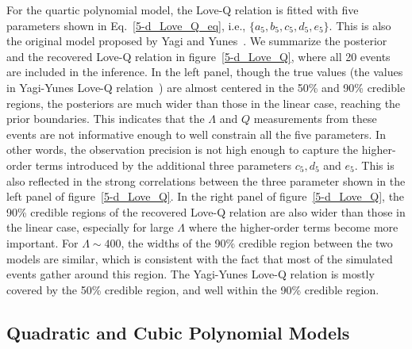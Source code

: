 \documentclass[a4paper,11pt]{article}
\begin{document}
For the quartic polynomial model, the Love-Q relation is fitted with five parameters shown in Eq.~\eqref{5-d_Love_Q_eq}, i.e., $\{a_5, b_5, c_5, d_5, e_5\}$. This is also the original model proposed by Yagi and Yunes~\cite{Yagi:2013awa}. We summarize the posterior and the recovered Love-Q relation in figure~\ref{5-d_Love_Q}, where
all 20 events are included in the inference. In the left panel, though the true values (the values in Yagi-Yunes Love-Q
relation~\cite{Yagi:2013awa}) are almost centered in the 50\% and 90\% credible regions, the posteriors are much wider than those in the linear case, reaching the prior boundaries. This indicates that the $\Lambda$ and $Q$ measurements
from these events are not informative enough to well constrain all the five parameters. In other words, the observation precision is not high enough to capture the higher-order terms introduced by the additional three parameters
$c_5, d_5$ and $e_5$. This is also reflected in the strong correlations between the three parameter shown in the left panel of figure~\ref{5-d_Love_Q}. In the right panel of figure~\ref{5-d_Love_Q}, the 90\% credible regions of the
recovered Love-Q relation are also wider than those in the linear case, especially for large $\Lambda$ where the higher-order terms become more important. For $\Lambda \sim 400$, the widths of the 90\% credible region between
the two models are similar, which is consistent with the fact that most of the simulated events gather around this region. The Yagi-Yunes Love-Q relation is mostly covered by the 50\% credible region, and well within the 90\% credible region.

\subsection{Quadratic and Cubic Polynomial Models}
\label{subsec:results_quadratic_cubic}
\end{document}

